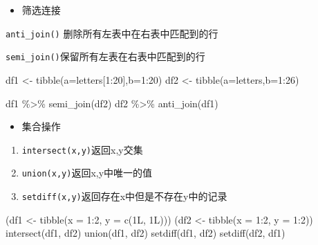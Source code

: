 \documentclass[
]{book}
\newenvironment{Shaded}{\begin{snugshade}}{\end{snugshade}}
\newcommand{\AttributeTok}[1]{\textcolor[rgb]{0.77,0.63,0.00}{#1}}
\newcommand{\DecValTok}[1]{\textcolor[rgb]{0.00,0.00,0.81}{#1}}
\newcommand{\FunctionTok}[1]{\textcolor[rgb]{0.00,0.00,0.00}{#1}}
\newcommand{\NormalTok}[1]{#1}
\newcommand{\OtherTok}[1]{\textcolor[rgb]{0.56,0.35,0.01}{#1}}
\newcommand{\SpecialCharTok}[1]{\textcolor[rgb]{0.00,0.00,0.00}{#1}}
\providecommand{\tightlist}{%
  \setlength{\itemsep}{0pt}\setlength{\parskip}{0pt}}
\begin{document}
\begin{itemize}
\tightlist
\item
  筛选连接
\end{itemize}

\texttt{anti\_join()} 删除所有左表中在右表中匹配到的行

\texttt{semi\_join()}保留所有左表在右表中匹配到的行

\begin{Shaded}
\begin{Highlighting}[]
\NormalTok{df1 }\OtherTok{\textless{}{-}} \FunctionTok{tibble}\NormalTok{(}\AttributeTok{a=}\NormalTok{letters[}\DecValTok{1}\SpecialCharTok{:}\DecValTok{20}\NormalTok{],}\AttributeTok{b=}\DecValTok{1}\SpecialCharTok{:}\DecValTok{20}\NormalTok{)}
\NormalTok{df2 }\OtherTok{\textless{}{-}} \FunctionTok{tibble}\NormalTok{(}\AttributeTok{a=}\NormalTok{letters,}\AttributeTok{b=}\DecValTok{1}\SpecialCharTok{:}\DecValTok{26}\NormalTok{)}

\NormalTok{df1 }\SpecialCharTok{\%\textgreater{}\%} \FunctionTok{semi\_join}\NormalTok{(df2)}
\NormalTok{df2 }\SpecialCharTok{\%\textgreater{}\%} \FunctionTok{anti\_join}\NormalTok{(df1)}
\end{Highlighting}
\end{Shaded}

\begin{itemize}
\tightlist
\item
  集合操作
\end{itemize}

\begin{enumerate}
\def\labelenumi{\arabic{enumi}.}
\item
  \texttt{intersect(x,y)}返回x,y交集
\item
  \texttt{union(x,y)}返回x,y中唯一的值
\item
  \texttt{setdiff(x,y)}返回存在x中但是不存在y中的记录
\end{enumerate}

\begin{Shaded}
\begin{Highlighting}[]
\NormalTok{(df1 }\OtherTok{\textless{}{-}} \FunctionTok{tibble}\NormalTok{(}\AttributeTok{x =} \DecValTok{1}\SpecialCharTok{:}\DecValTok{2}\NormalTok{, }\AttributeTok{y =} \FunctionTok{c}\NormalTok{(1L, 1L)))}
\NormalTok{(df2 }\OtherTok{\textless{}{-}} \FunctionTok{tibble}\NormalTok{(}\AttributeTok{x =} \DecValTok{1}\SpecialCharTok{:}\DecValTok{2}\NormalTok{, }\AttributeTok{y =} \DecValTok{1}\SpecialCharTok{:}\DecValTok{2}\NormalTok{))}
\FunctionTok{intersect}\NormalTok{(df1, df2)}
\FunctionTok{union}\NormalTok{(df1, df2)}
\FunctionTok{setdiff}\NormalTok{(df1, df2)}
\FunctionTok{setdiff}\NormalTok{(df2, df1)}
\end{Highlighting}
\end{Shaded}
\end{document}
